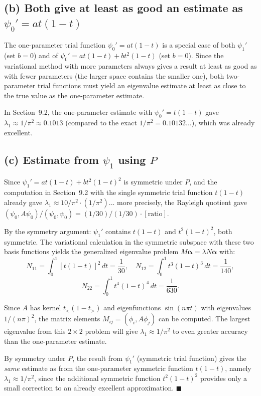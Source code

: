 \documentclass[12pt]{article}
\begin{document}
\subsection*{(b) Both give at least as good an estimate as $\psi_0' = at(1-t)$}

The one-parameter trial function $\psi_0' = at(1-t)$ is a special case of both $\psi_1'$ (set $b = 0$) and of $\psi_0' = at(1-t) + bt^2(1-t)$ (set $b = 0$). Since the variational method with more parameters always gives a result at least as good as with fewer parameters (the larger space contains the smaller one), both two-parameter trial functions must yield an eigenvalue estimate at least as close to the true value as the one-parameter estimate.

In Section~9.2, the one-parameter estimate with $\psi_0' = t(1-t)$ gave $\lambda_1 \approx 1/\pi^2 \approx 0.1013$ (compared to the exact $1/\pi^2 = 0.10132\ldots$), which was already excellent.

\subsection*{(c) Estimate from $\psi_1$ using $P$}

Since $\psi_1' = at(1-t) + bt^2(1-t)^2$ is symmetric under $P$, and the computation in Section~9.2 with the single symmetric trial function $t(1-t)$ already gave $\lambda_1 \approx 10/\pi^2 \cdot (1/\pi^2)$... more precisely, the Rayleigh quotient gave $(\psi_0, A\psi_0)/(\psi_0, \psi_0) = (1/30)/(1/30) \cdot [\text{ratio}]$.

By the symmetry argument: $\psi_1'$ contains $t(1-t)$ and $t^2(1-t)^2$, both symmetric. The variational calculation in the symmetric subspace with these two basis functions yields the generalized eigenvalue problem $M\boldsymbol{\alpha} = \lambda N\boldsymbol{\alpha}$ with:
\[
N_{11} = \int_0^1 [t(1-t)]^2\,dt = \frac{1}{30}, \quad N_{12} = \int_0^1 t^3(1-t)^3\,dt = \frac{1}{140},
\]
\[
N_{22} = \int_0^1 t^4(1-t)^4\,dt = \frac{1}{630}.
\]

Since $A$ has kernel $t_<(1-t_>)$ and eigenfunctions $\sin(n\pi t)$ with eigenvalues $1/(n\pi)^2$, the matrix elements $M_{ij} = (\phi_i, A\phi_j)$ can be computed. The largest eigenvalue from this $2 \times 2$ problem will give $\lambda_1 \approx 1/\pi^2$ to even greater accuracy than the one-parameter estimate.

By symmetry under $P$, the result from $\psi_1'$ (symmetric trial function) gives the \emph{same} estimate as from the one-parameter symmetric function $t(1-t)$, namely $\boxed{\lambda_1 \approx 1/\pi^2}$, since the additional symmetric function $t^2(1-t)^2$ provides only a small correction to an already excellent approximation. \hfill $\blacksquare$
\end{document}
